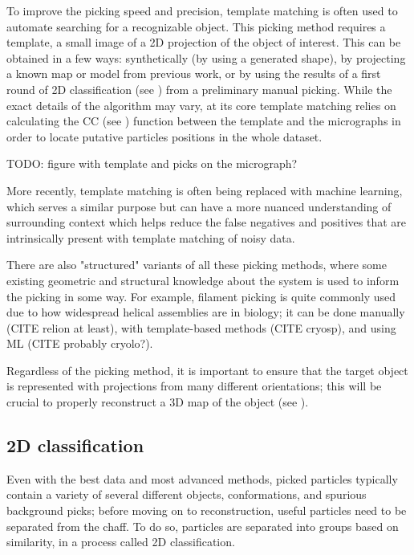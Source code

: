 To improve the picking speed and precision, template matching is often used to automate searching for a recognizable object.
This picking method requires a template, a small image of a 2D projection of the object of interest.
This can be obtained in a few ways: synthetically (by using a generated shape), by projecting a known map or model from previous work, or by using the results of a first round of 2D classification (see ) from a preliminary manual picking.
While the exact details of the algorithm may vary, at its core template matching relies on calculating the CC (see ) function between the template and the micrographs in order to locate putative particles positions in the whole dataset.

TODO: figure with template and picks on the micrograph?

More recently, template matching is often being replaced with machine learning, which serves a similar purpose but can have a more nuanced understanding of surrounding context which helps reduce the false negatives and positives that are intrinsically present with template matching of noisy data.

There are also "structured" variants of all these picking methods, where some existing geometric and structural knowledge about the system is used to inform the picking in some way.
For example, filament picking is quite commonly used due to how widespread helical assemblies are in biology; it can be done manually (CITE relion at least), with template-based methods (CITE cryosp), and using ML (CITE probably cryolo?).

Regardless of the picking method, it is important to ensure that the target object is represented with projections from many different orientations; this will be crucial to properly reconstruct a 3D map of the object (see ).

\subsection{2D classification}\label{em_classification}

Even with the best data and most advanced methods, picked particles typically contain a variety of several different objects, conformations, and spurious background picks; before moving on to reconstruction, useful particles need to be separated from the chaff.
To do so, particles are separated into groups based on similarity, in a process called 2D classification.

